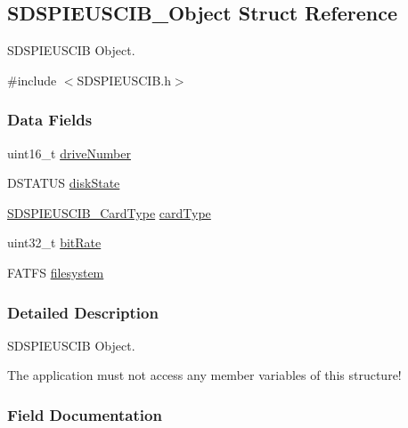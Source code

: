 \subsection{S\-D\-S\-P\-I\-E\-U\-S\-C\-I\-B\-\_\-\-Object Struct Reference}
\label{struct_s_d_s_p_i_e_u_s_c_i_b___object}


S\-D\-S\-P\-I\-E\-U\-S\-C\-I\-B Object.  




{\ttfamily \#include $<$S\-D\-S\-P\-I\-E\-U\-S\-C\-I\-B.\-h$>$}

\subsubsection*{Data Fields}
\begin{DoxyCompactItemize}
\item 
uint16\-\_\-t \hyperlink{struct_s_d_s_p_i_e_u_s_c_i_b___object_a8130564eeb4c4fec78f98bc8de83cd00}{drive\-Number}
\item 
D\-S\-T\-A\-T\-U\-S \hyperlink{struct_s_d_s_p_i_e_u_s_c_i_b___object_acf52e179c29f0bd89168035ef525a266}{disk\-State}
\item 
\hyperlink{_s_d_s_p_i_e_u_s_c_i_b_8h_a4fa2b3bc20d44e2e53e621d22a3d77a3}{S\-D\-S\-P\-I\-E\-U\-S\-C\-I\-B\-\_\-\-Card\-Type} \hyperlink{struct_s_d_s_p_i_e_u_s_c_i_b___object_a3e9f9d8f1abb3212dc562f1660425a05}{card\-Type}
\item 
uint32\-\_\-t \hyperlink{struct_s_d_s_p_i_e_u_s_c_i_b___object_ae13e937c65dad9e121a5308fd3eeb44a}{bit\-Rate}
\item 
F\-A\-T\-F\-S \hyperlink{struct_s_d_s_p_i_e_u_s_c_i_b___object_ab6b0744727dfe999c9e73177cb81509e}{filesystem}
\end{DoxyCompactItemize}


\subsubsection{Detailed Description}
S\-D\-S\-P\-I\-E\-U\-S\-C\-I\-B Object. 

The application must not access any member variables of this structure! 

\subsubsection{Field Documentation}
